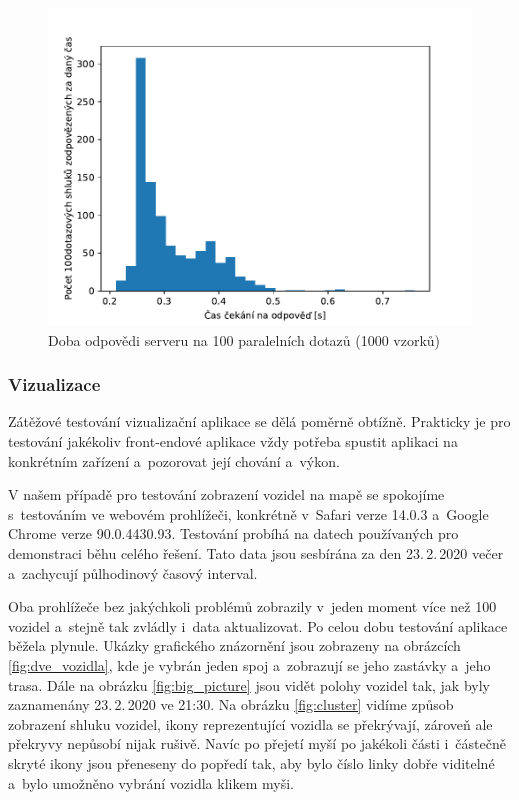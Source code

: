 \begin{figure}
   \centering
 \includegraphics[width=\linewidth]{../img/server_response_time}
 \caption{Doba odpovědi serveru na 100 paralelních dotazů (1000 vzorků)}
 \label{fig:server_response_time}
\end{figure}


\subsubsection{Vizualizace}

Zátěžové testování vizualizační aplikace se dělá poměrně obtížně. Prakticky je pro testování jakékoliv front-endové aplikace vždy potřeba spustit aplikaci na konkrétním zařízení a~pozorovat její chování a~výkon.


\bigbreak

V našem případě pro testování zobrazení vozidel na mapě se spokojíme s~testováním ve webovém prohlížeči, konkrétně v~Safari verze 14.0.3 a~Google Chrome verze 90.0.4430.93. Testování probíhá na datech používaných pro demonstraci běhu celého řešení. Tato data jsou sesbírána za den 23.\,2.\,2020 večer a~zachycují půlhodinový časový interval.


\bigbreak

Oba prohlížeče bez jakýchkoli problémů zobrazily v~jeden moment více než 100 vozidel a~stejně tak zvládly i~data aktualizovat. Po celou dobu testování aplikace běžela plynule. Ukázky grafického znázornění jsou zobrazeny na obrázcích \ref{fig:dve_vozidla}, kde je vybrán jeden spoj a~zobrazují se jeho zastávky a~jeho trasa. Dále na obrázku \ref{fig:big_picture} jsou vidět polohy vozidel tak, jak byly zaznamenány 23.\,2.\,2020 ve 21:30. Na obrázku \ref{fig:cluster} vidíme způsob zobrazení shluku vozidel, ikony reprezentující vozidla se překrývají, zároveň ale překryvy nepůsobí nijak rušivě. Navíc po přejetí myší po jakékoli části i~částečně skryté ikony jsou přeneseny do popředí tak, aby bylo číslo linky dobře viditelné a~bylo umožněno vybrání vozidla klikem myši.


